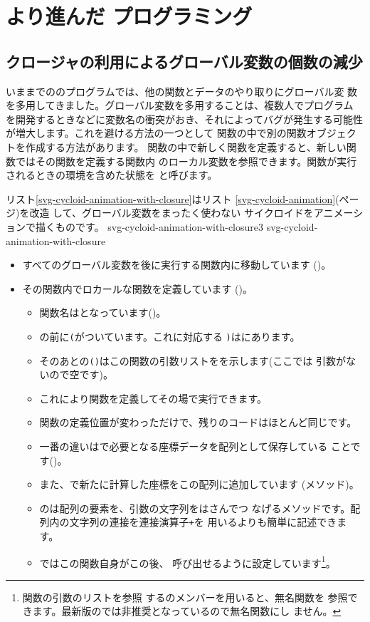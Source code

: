 \section{より進んだ \JS プログラミング}
\subsection{クロージャの利用によるグローバル変数の個数の減少}
いままでの\JS のプログラムでは、他の関数とデータのやり取りにグローバル変
数を多用してきました。グローバル変数を多用することは、複数人でプログラム
を開発するときなどに変数名の衝突がおき、それによってバグが発生する可能性
が増大します。これを避ける方法の一つとして%
関数の中で別の関数オブジェクトを作成する方法があります。
関数の中で新しく関数を定義すると、新しい関数ではその関数を定義する関数内
のローカル変数を参照できます。関数が実行されるときの環境を含めた状態を
と呼びます。

リスト\ref{svg-cycloid-animation-with-closure}はリスト
\ref{svg-cycloid-animation}(\pageref{svg-cycloid-animation}ページ)を改造
して、グローバル変数をまったく使わない
サイクロイドをアニメーションで描くものです。
{svg-cycloid-animation-with-closure3}
{svg-cycloid-animation-with-closure}
\begin{itemize}
 \item すべてのグローバル変数を後に実行する関数内に移動しています
       ()。
 \item その関数内でロカールな関数を定義しています
			 ()。
\begin{itemize}
 \item 関数名はとなっています()。
 \item {}の前に\texttt{(}がついています。これに対応する
			 \texttt{)}はにあります。
 \item そのあとの\texttt{()}はこの関数の引数リストをを示します(ここでは
			 引数がないので空です)。
 \item これにより関数を定義してその場で実行できます。
 \item 関数の定義位置が変わっただけで、残りのコードはほとんど同じです。
 \item 一番の違いはで必要となる座標データを配列として保存している
			 ことです()。
 \item また、で新たに計算した座標をこの配列に追加しています
			 (メソッド)。
 \item {}のは配列の要素を、引数の文字列をはさんでつ
       なげるメソッドです。配列内の文字列の連接を連接演算子\texttt{+}を
       用いるよりも簡単に記述できます。
 \item {}ではこの関数自身がこの後、
			 呼び出せるように設定しています\footnote{関数の引数のリストを参照
			 するのメンバーを用いると、無名関数を
			 参照できます。最新版の\JS では非推奨となっているので無名関数にし
			 ません。}。
\end{itemize}

\end{itemize}
\iffalse
